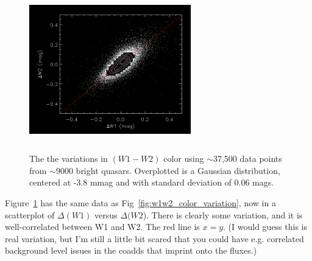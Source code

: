 \documentclass[apj]{emulateapj}
\begin{document}
    \begin{figure}
      \includegraphics[width=7.00cm, height=7.00cm, 
      trim=0.0cm 0.0cm 0.0cm 0.0cm, clip]
      {scatter_dW1_dW2.png}
      \centering
      \caption[]{The the variations in $(W1-W2)$ color using
        $\sim$37,500 data points from $\sim$9000 bright quasars. Overplotted
        is a Gaussian distribution, centered at -3.8 mmag and with standard
        deviation of 0.06 mags.}
      \label{fig:scatter_dW1_dW2}
    \end{figure}
    Figure~\ref{fig:scatter_dW1_dW2} has the same data as
    Fig~\ref{fig:w1w2_color_variation}, now in a scatterplot of
    $\Delta(W1)$ versus $\Delta(W2$). There is clearly some variation, and
    it is well-correlated between W1 and W2. The red line is $x=y$. 
    (I would guess this is real variation, but I'm still a little bit scared that
    you could have e.g. correlated background level issues in the coadds
    that imprint onto the fluxes.)
\end{document}
